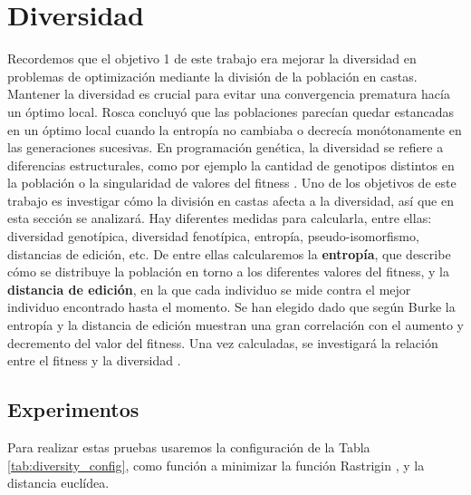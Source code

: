 \section{Diversidad}

Recordemos que el objetivo 1 de este trabajo era mejorar la diversidad en problemas de optimización mediante la división de la población en castas.
Mantener la diversidad es crucial para evitar una convergencia prematura hacía un óptimo local. Rosca \cite{Rosca} concluyó que las poblaciones parecían quedar estancadas
en un óptimo local cuando la entropía no cambiaba o decrecía monótonamente en las generaciones sucesivas. En programación genética, la diversidad se refiere a diferencias estructurales, 
como por ejemplo la cantidad de genotipos distintos en la población o la singularidad de valores del fitness \cite{genetic}. Uno de los objetivos de este trabajo es investigar cómo la 
división en castas afecta a la diversidad, así que en esta sección se analizará.  Hay diferentes medidas para calcularla, entre ellas: diversidad genotípica, 
diversidad fenotípica, entropía, pseudo-isomorfismo, distancias de edición, etc. De entre ellas calcularemos la \textbf{entropía}, que describe cómo se distribuye la
población en torno a los diferentes valores del fitness, y la \textbf{distancia de edición}, en la que cada individuo se mide contra el mejor individuo encontrado hasta el 
momento. Se han elegido dado que según Burke \cite{diversity} la entropía y la distancia de edición muestran una gran correlación con el aumento y decremento del valor 
del fitness. Una vez calculadas, se investigará la relación entre el fitness y la diversidad \cite{diversity}. 

\subsection{Experimentos}

Para realizar estas pruebas usaremos la configuración de la Tabla \ref{tab:diversity_config}, como función a minimizar la función Rastrigin \cite{BBOB}, y la distancia euclídea.

